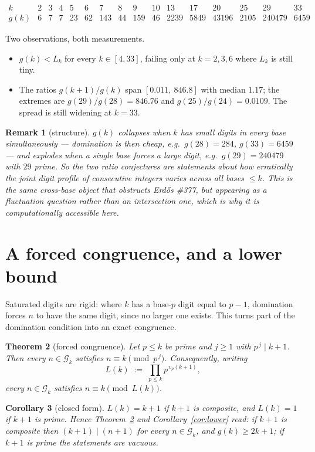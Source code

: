 \documentclass[11pt]{article}
\newtheorem{theorem}{Theorem}
\newtheorem{corollary}[theorem]{Corollary}
\newtheorem{remark}[theorem]{Remark}
\begin{document}
\[
\begin{array}{r|rrrrrrrrrrrrrrr}
 k & 2&3&4&5&6&7&8&9&10&13&17&20&25&29&33\\\hline
 g(k) & 6&7&7&23&62&143&44&159&46&2239&5849&43196&2105&240479&6459
\end{array}
\]

\noindent Two observations, both measurements.
\begin{itemize}
\item $g(k)<L_k$ for every $k\in[4,33]$, failing only at $k=2,3,6$ where $L_k$ is still tiny.
\item The ratios $g(k{+}1)/g(k)$ span $[0.011,\ 846.8]$ with median $1.17$; the extremes are
      $g(29)/g(28)=846.76$ and $g(25)/g(24)=0.0109$.  The spread is still widening at $k=33$.
\end{itemize}

\begin{remark}[structure]
$g(k)$ collapses when $k$ has small digits in every base simultaneously --- domination is
then cheap, e.g.\ $g(28)=284$, $g(33)=6459$ --- and explodes when a single base forces a
large digit, e.g.\ $g(29)=240479$ with $29$ prime.  So the two ratio conjectures are
statements about how erratically the joint digit profile of consecutive integers varies
across all bases $\le k$.  This is the same cross-base object that obstructs Erd\H{o}s
\#377, but appearing as a \emph{fluctuation} question rather than an intersection one, which
is why it is computationally accessible here.
\end{remark}

\section{A forced congruence, and a lower bound}

Saturated digits are rigid: where $k$ has a base-$p$ digit equal to $p-1$, domination forces
$n$ to have the same digit, since no larger one exists.  This turns part of the domination
condition into an exact congruence.

\begin{theorem}[forced congruence]\label{thm:congr}
Let $p\le k$ be prime and $j\ge1$ with $p^{\,j}\mid k+1$.  Then every $n\in\mathcal G_k$
satisfies $n\equiv k\pmod{p^{\,j}}$.  Consequently, writing
\[
  L(k)\;:=\;\prod_{p\le k}p^{\,v_p(k+1)},
\]
every $n\in\mathcal G_k$ satisfies $n\equiv k\pmod{L(k)}$.
\end{theorem}

\begin{corollary}[closed form]\label{cor:Lclosed}
$L(k)=k+1$ if $k+1$ is composite, and $L(k)=1$ if $k+1$ is prime.  Hence
Theorem~\ref{thm:congr} and Corollary~\ref{cor:lower} read: \emph{if $k+1$ is composite then
$(k+1)\mid(n+1)$ for every $n\in\mathcal G_k$, and $g(k)\ge2k+1$; if $k+1$ is prime the
statements are vacuous.}
\end{corollary}
\end{document}
